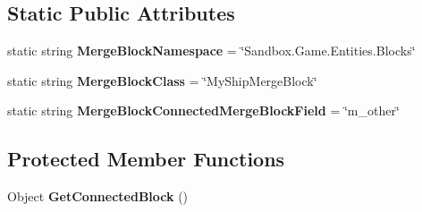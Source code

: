 \subsection*{Static Public Attributes}
\begin{DoxyCompactItemize}
\item 
\hypertarget{class_s_e_mod_a_p_i_internal_1_1_a_p_i_1_1_entity_1_1_sector_1_1_sector_object_1_1_cube_grid_1_15c3f321f9502c29c7df9fbd0ea065d76_afced4b0ef4e06fd159282191f8c83fc1}{}static string {\bfseries Merge\+Block\+Namespace} = \char`\"{}Sandbox.\+Game.\+Entities.\+Blocks\char`\"{}\label{class_s_e_mod_a_p_i_internal_1_1_a_p_i_1_1_entity_1_1_sector_1_1_sector_object_1_1_cube_grid_1_15c3f321f9502c29c7df9fbd0ea065d76_afced4b0ef4e06fd159282191f8c83fc1}

\item 
\hypertarget{class_s_e_mod_a_p_i_internal_1_1_a_p_i_1_1_entity_1_1_sector_1_1_sector_object_1_1_cube_grid_1_15c3f321f9502c29c7df9fbd0ea065d76_a74f89652767afadac017ae0132116741}{}static string {\bfseries Merge\+Block\+Class} = \char`\"{}My\+Ship\+Merge\+Block\char`\"{}\label{class_s_e_mod_a_p_i_internal_1_1_a_p_i_1_1_entity_1_1_sector_1_1_sector_object_1_1_cube_grid_1_15c3f321f9502c29c7df9fbd0ea065d76_a74f89652767afadac017ae0132116741}

\item 
\hypertarget{class_s_e_mod_a_p_i_internal_1_1_a_p_i_1_1_entity_1_1_sector_1_1_sector_object_1_1_cube_grid_1_15c3f321f9502c29c7df9fbd0ea065d76_a1eb3dbc404afcb6c65afa32f15db2151}{}static string {\bfseries Merge\+Block\+Connected\+Merge\+Block\+Field} = \char`\"{}m\+\_\+other\char`\"{}\label{class_s_e_mod_a_p_i_internal_1_1_a_p_i_1_1_entity_1_1_sector_1_1_sector_object_1_1_cube_grid_1_15c3f321f9502c29c7df9fbd0ea065d76_a1eb3dbc404afcb6c65afa32f15db2151}

\end{DoxyCompactItemize}
\subsection*{Protected Member Functions}
\begin{DoxyCompactItemize}
\item 
\hypertarget{class_s_e_mod_a_p_i_internal_1_1_a_p_i_1_1_entity_1_1_sector_1_1_sector_object_1_1_cube_grid_1_15c3f321f9502c29c7df9fbd0ea065d76_afa67323ab0631a2c7690537a04f344fc}{}Object {\bfseries Get\+Connected\+Block} ()\label{class_s_e_mod_a_p_i_internal_1_1_a_p_i_1_1_entity_1_1_sector_1_1_sector_object_1_1_cube_grid_1_15c3f321f9502c29c7df9fbd0ea065d76_afa67323ab0631a2c7690537a04f344fc}

\end{DoxyCompactItemize}
